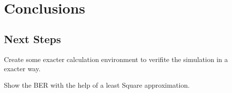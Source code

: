 
\chapter{Conclusions} \label{chp:conclusions}


\section{Next Steps}

Create some exacter calculation environment to verifite the simulation in a exacter way.

Show the BER with the help of a least Square approximation.
